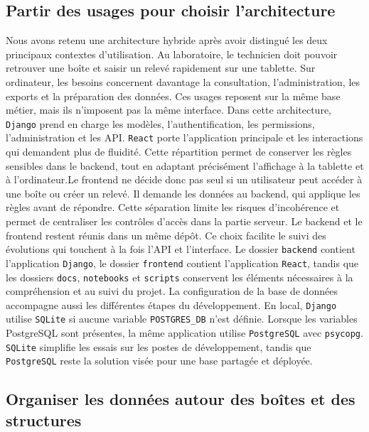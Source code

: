 \documentclass{article}
\begin{document}
\subsection{Partir des usages pour choisir l’architecture}

Nous avons retenu une architecture hybride après avoir distingué les deux principaux contextes d’utilisation. Au laboratoire, le technicien doit pouvoir retrouver une boîte et saisir un relevé rapidement sur une tablette. Sur ordinateur, les besoins concernent davantage la consultation, l’administration, les exports et la préparation des données. Ces usages reposent sur la même base métier, mais ils n’imposent pas la même interface.
Dans cette architecture, \texttt{Django} prend en charge les modèles, l’authentification, les permissions, l’administration et les API. \texttt{React} porte l’application principale et les interactions qui demandent plus de fluidité. Cette répartition permet de conserver les règles sensibles dans le backend, tout en adaptant précisément l’affichage à la tablette et à l’ordinateur.Le frontend ne décide donc pas seul si un utilisateur peut accéder à une boîte ou créer un relevé. 
Il demande les données au backend, qui applique les règles avant de répondre. Cette séparation limite les risques d’incohérence et permet de centraliser les contrôles d’accès dans la partie serveur.
Le backend et le frontend restent réunis dans un même dépôt. Ce choix facilite le suivi des évolutions qui touchent à la fois l’API et l’interface. Le dossier \texttt{backend} contient l’application \texttt{Django}, le dossier \texttt{frontend} contient l’application \texttt{React}, tandis que les dossiers \texttt{docs}, \texttt{notebooks} et \texttt{scripts} conservent les éléments nécessaires à la compréhension et au suivi du projet.
La configuration de la base de données accompagne aussi les différentes étapes du développement. En local, \texttt{Django} utilise \texttt{SQLite} si aucune variable \texttt{POSTGRES\_DB} n’est définie. Lorsque les variables PostgreSQL sont présentes, la même application utilise \texttt{PostgreSQL} avec \texttt{psycopg}. \texttt{SQLite} simplifie les essais sur les postes de développement, tandis que \texttt{PostgreSQL} reste la solution visée pour une base partagée et déployée.



\subsection{Organiser les données autour des boîtes et des structures}
\end{document}

